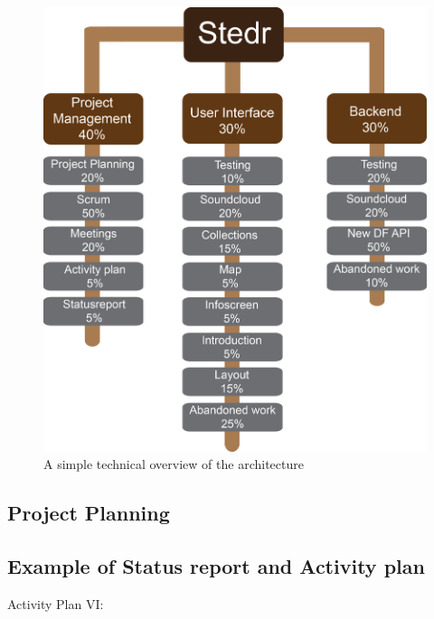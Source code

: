 \begin{figure}[h!]
\begin{center}
\includegraphics[scale=0.6]{WBS}
\caption{A simple technical overview of the architecture}
\end{center}
\end{figure}

\subsection{Project Planning}
\subsection{Example of Status report and Activity plan}


Activity Plan VI:  %
%

